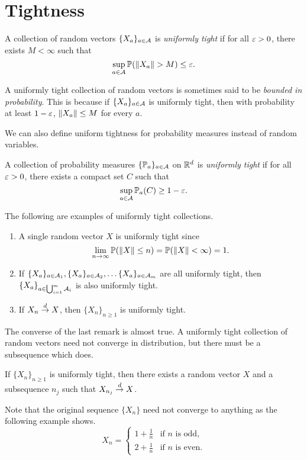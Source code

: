 \section{Tightness}
\begin{definition}
    A collection of random vectors $\{X_a\}_{a \in {\mathcal{A}}}$ is \emph{uniformly tight} if for all $\varepsilon > 0$, there exists $M < \infty$ such that 
    \[\sup_{a \in \A} \Pa(\norm{X_a}> M) \le \eps.\]
\end{definition}
A uniformly tight collection of random vectors is sometimes said to be \emph{bounded in probability}. This is because if $\{X_a\}_{a \in {\mathcal{A}}}$ is uniformly tight, then with probability at least $1-\varepsilon$, $\left\|X_a\right\| \le M$ for every $a$.

We can also define uniform tightness for probability measures instead of random variables.
\begin{definition}
    A collection of probability measures $\{{\mathbb{P}}_a\}_{a \in {\mathcal{A}}}$ on ${\mathbb R}^d$ is \emph{uniformly tight} if for all $\varepsilon > 0$, there exists a compact set $C$ such that 
    \[\sup_{a \in {\mathcal{A}}} {\mathbb{P}}_a(C) \ge 1-\varepsilon.\]
\end{definition}
\begin{remark} 
    The following are examples of uniformly tight collections.
    \begin{enumerate}
        \item A single random vector $X$ is uniformly tight since \[\lim_{n \to \infty} {\mathbb{P}}(\left\|X\right\| \le n) = {\mathbb{P}}(\left\|X\right\| < \infty) =1.\]
        \item If $\{X_a\}_{a \in {\mathcal{A}}_1},\{X_a\}_{a \in {\mathcal{A}}_2},\ldots \{X_a\}_{a \in {\mathcal{A}}_m}$ are all uniformly tight, then $\{X_a\}_{a \in \bigcup_{i=1}^m {\mathcal{A}}_i}$ is also uniformly tight.
        \item If $X_n \stackrel{d}{\to} X$, then $\{X_n\}_{n \ge 1}$ is uniformly tight.
    \end{enumerate}
    The converse of the last remark is almost true. A uniformly tight collection of random vectors need not converge in distribution, but there must be a subsequence which does.
\end{remark}
\begin{theorem}
    If $\{X_n\}_{n \ge 1}$ is uniformly tight, then there exists a random vector $X$ and a subsequence $n_j$ such that $X_{n_j} \stackrel{d}{\to} X$.
\end{theorem}
Note that the original sequence $\{X_n\}$ need not converge to anything as the following example shows.
\[X_n = \begin{cases}
    1+\frac{1}{n} & \text{if $n$ is odd},\\
    2+\frac{1}{n} & \text{if $n$ is even}.
\end{cases} \]
